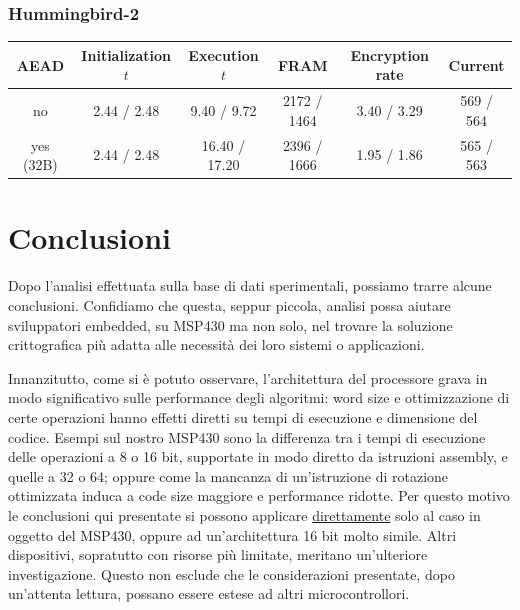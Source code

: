 \documentclass[target=bach,aauheader=,style=]{thud}
\begin{document}
		\subsection{Hummingbird-2}
		\begin{center}
			\begin{tabular}{|c| *{5}{c|}}
				\hline
				\textbf{AEAD} & \textbf{Initialization} $t$& \textbf{Execution} $t$ & \textbf{FRAM} & \textbf{Encryption rate} & \textbf{Current} \\
				\hline
				no & \textcolor{Mahogany}{2.44} / \textcolor{OliveGreen}{2.48} & \textcolor{Mahogany}{9.40} / \textcolor{OliveGreen}{9.72} & \textcolor{Mahogany}{2172} / \textcolor{OliveGreen}{1464} & \textcolor{Mahogany}{3.40} / \textcolor{OliveGreen}{3.29} & \textcolor{Mahogany}{569} / \textcolor{OliveGreen}{564} \\
				\hline
				yes (32B) & \textcolor{Mahogany}{2.44} / \textcolor{OliveGreen}{2.48} & \textcolor{Mahogany}{16.40} / \textcolor{OliveGreen}{17.20} & \textcolor{Mahogany}{2396} / \textcolor{OliveGreen}{1666} & \textcolor{Mahogany}{1.95} / \textcolor{OliveGreen}{1.86} & \textcolor{Mahogany}{565} / \textcolor{OliveGreen}{563} \\
				\hline
			\end{tabular}
		\end{center}
		
		
\chapter{Conclusioni}
Dopo l'analisi effettuata sulla base di dati sperimentali, possiamo trarre alcune conclusioni. Confidiamo che questa, seppur piccola, analisi possa aiutare sviluppatori embedded, su MSP430 ma non solo, nel trovare la soluzione crittografica più adatta alle necessità dei loro sistemi o applicazioni.

Innanzitutto, come si è potuto osservare, l'architettura del processore grava in modo significativo sulle performance degli algoritmi: word size e ottimizzazione di certe operazioni hanno effetti diretti su tempi di esecuzione e dimensione del codice. Esempi sul nostro MSP430 sono la differenza tra i tempi di esecuzione delle operazioni a 8 o 16 bit, supportate in modo diretto da istruzioni assembly, e quelle a 32 o 64; oppure come la mancanza di un'istruzione di rotazione ottimizzata induca a code size maggiore e performance ridotte\cite{tiassembly}. Per questo motivo le conclusioni qui presentate si possono applicare \underline{direttamente} solo al caso in oggetto del MSP430, oppure ad un'architettura 16 bit molto simile. Altri dispositivi, sopratutto con risorse più limitate, meritano un'ulteriore investigazione. Questo non esclude che le considerazioni presentate, dopo un'attenta lettura, possano essere estese ad altri microcontrollori.
\end{document}
